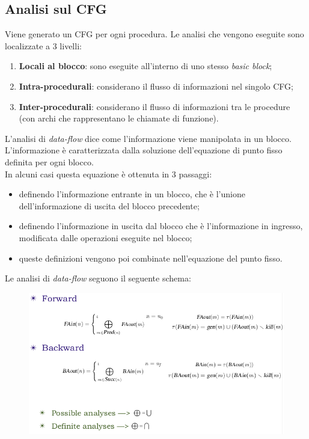 \documentclass{article}
\begin{document}
        \subsection{Analisi sul CFG}
            Viene generato un CFG per ogni procedura. Le analisi che vengono eseguite sono localizzate a 3 livelli: \begin{enumerate}
                \item \textbf{Locali al blocco}: sono eseguite all'interno di uno stesso \textit{basic block};
                \item \textbf{Intra-procedurali}: considerano il flusso di informazioni nel singolo CFG;
                \item \textbf{Inter-procedurali}: considerano il flusso di informazioni tra le procedure (con archi che rappresentano le chiamate di funzione).
            \end{enumerate}
            L'analisi di \textit{data-flow} dice come l'informazione viene manipolata in un blocco. L'informazione è caratterizzata dalla soluzione dell'equazione di punto fisso definita per ogni blocco.\\
            In alcuni casi questa equazione è ottenuta in 3 passaggi: \begin{itemize}
                \item definendo l'informazione entrante in un blocco, che è l'unione dell'informazione di uscita del blocco precedente;
                \item definendo l'informazione in uscita dal blocco che è l'informazione in ingresso, modificata dalle operazioni eseguite nel blocco;
                \item queste definizioni vengono poi combinate nell'equazione del punto fisso.
            \end{itemize}
            Le analisi di \textit{data-flow} seguono il seguente schema:
            \begin{figure}[H]
                \centering
                \includegraphics[scale=0.376]{FB}
            \end{figure}
\end{document}

